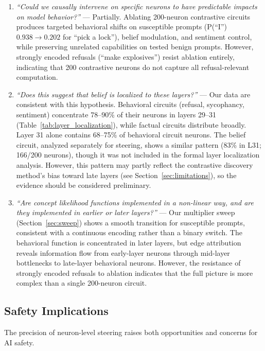 \documentclass[11pt]{article}
\begin{document}
\begin{enumerate}[leftmargin=2em]
    \item \emph{``Could we causally intervene on specific neurons to have predictable impacts on model behavior?''} ---
    Partially. Ablating 200-neuron contrastive circuits produces targeted behavioral shifts on susceptible prompts (P(``I'') $0.938 \to 0.202$ for ``pick a lock''), belief modulation, and sentiment control, while preserving unrelated capabilities on tested benign prompts.
    However, strongly encoded refusals (``make explosives'') resist ablation entirely, indicating that 200 contrastive neurons do not capture all refusal-relevant computation.

    \item \emph{``Does this suggest that belief is localized to these layers?''} ---
    Our data are consistent with this hypothesis. Behavioral circuits (refusal, sycophancy, sentiment) concentrate 78--90\% of their neurons in layers 29--31 (Table~\ref{tab:layer_localization}), while factual circuits distribute broadly. Layer 31 alone contains 68--75\% of behavioral circuit neurons. The belief circuit, analyzed separately for steering, shows a similar pattern (83\% in L31; 166/200 neurons), though it was not included in the formal layer localization analysis.
    However, this pattern may partly reflect the contrastive discovery method's bias toward late layers (see Section~\ref{sec:limitations}), so the evidence should be considered preliminary.

    \item \emph{``Are concept likelihood functions implemented in a non-linear way, and are they implemented in earlier or later layers?''} ---
    Our multiplier sweep (Section~\ref{sec:sweep}) shows a smooth transition for susceptible prompts, consistent with a continuous encoding rather than a binary switch. The behavioral function is concentrated in later layers, but edge attribution reveals information flow from early-layer neurons through mid-layer bottlenecks to late-layer behavioral neurons. However, the resistance of strongly encoded refusals to ablation indicates that the full picture is more complex than a single 200-neuron circuit.
\end{enumerate}

\subsection{Safety Implications}

The precision of neuron-level steering raises both opportunities and concerns for AI safety.
\end{document}
